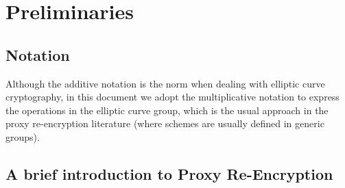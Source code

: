 \documentclass{amsart}
\begin{document}
%
%

\section{Preliminaries}

\subsection{Notation}

Although the additive notation is the norm when dealing with elliptic curve cryptography, in this document we adopt the multiplicative notation to express the operations in the elliptic curve group, which is the usual approach in the proxy re-encryption literature (where schemes are usually defined in generic groups).

\subsection{A brief introduction to Proxy Re-Encryption}

\end{document}
